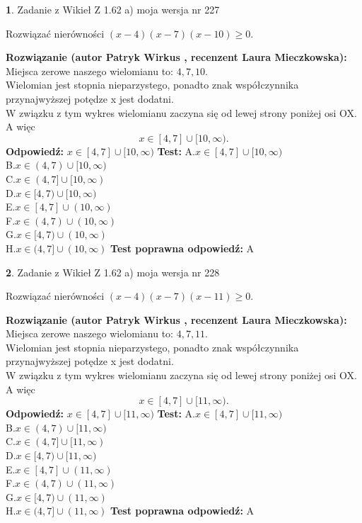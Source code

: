 \documentclass[12pt, a4paper]{article}
\theoremstyle{definition} %
\newtheorem{zad}{}
\newcommand{\zadStart}[1]{\begin{zad}#1\newline}
\newcommand{\zadStop}{\end{zad}}
\newcommand{\rozwStart}[2]{\noindent \textbf{Rozwiązanie (autor #1 , recenzent #2): }\newline}
\newcommand{\rozwStop}{\newline}
\newcommand{\odpStart}{\noindent \textbf{Odpowiedź:}\newline}
\newcommand{\odpStop}{\newline}
\newcommand{\testStart}{\noindent \textbf{Test:}\newline}
\newcommand{\testStop}{\newline}
\newcommand{\kluczStart}{\noindent \textbf{Test poprawna odpowiedź:}\newline}
\newcommand{\kluczStop}{\newline}
\begin{document}
\zadStart{Zadanie z Wikieł Z 1.62 a) moja wersja nr 227}

Rozwiązać nierówności $(x-4)(x-7)(x-10)\ge0$.
\zadStop
\rozwStart{Patryk Wirkus}{Laura Mieczkowska}
Miejsca zerowe naszego wielomianu to: $4, 7, 10$.\\
Wielomian jest stopnia nieparzystego, ponadto znak współczynnika przy\linebreak najwyższej potędze x jest dodatni.\\ W związku z tym wykres wielomianu zaczyna się od lewej strony poniżej osi OX. A więc $$x \in [4,7] \cup [10,\infty).$$
\rozwStop
\odpStart
$x \in [4,7] \cup [10,\infty)$
\odpStop
\testStart
A.$x \in [4,7] \cup [10,\infty)$\\
B.$x \in (4,7) \cup [10,\infty)$\\
C.$x \in (4,7] \cup [10,\infty)$\\
D.$x \in [4,7) \cup [10,\infty)$\\
E.$x \in [4,7] \cup (10,\infty)$\\
F.$x \in (4,7) \cup (10,\infty)$\\
G.$x \in [4,7) \cup (10,\infty)$\\
H.$x \in (4,7] \cup (10,\infty)$
\testStop
\kluczStart
A
\kluczStop



\zadStart{Zadanie z Wikieł Z 1.62 a) moja wersja nr 228}

Rozwiązać nierówności $(x-4)(x-7)(x-11)\ge0$.
\zadStop
\rozwStart{Patryk Wirkus}{Laura Mieczkowska}
Miejsca zerowe naszego wielomianu to: $4, 7, 11$.\\
Wielomian jest stopnia nieparzystego, ponadto znak współczynnika przy\linebreak najwyższej potędze x jest dodatni.\\ W związku z tym wykres wielomianu zaczyna się od lewej strony poniżej osi OX. A więc $$x \in [4,7] \cup [11,\infty).$$
\rozwStop
\odpStart
$x \in [4,7] \cup [11,\infty)$
\odpStop
\testStart
A.$x \in [4,7] \cup [11,\infty)$\\
B.$x \in (4,7) \cup [11,\infty)$\\
C.$x \in (4,7] \cup [11,\infty)$\\
D.$x \in [4,7) \cup [11,\infty)$\\
E.$x \in [4,7] \cup (11,\infty)$\\
F.$x \in (4,7) \cup (11,\infty)$\\
G.$x \in [4,7) \cup (11,\infty)$\\
H.$x \in (4,7] \cup (11,\infty)$
\testStop
\kluczStart
A
\kluczStop
\end{document}
